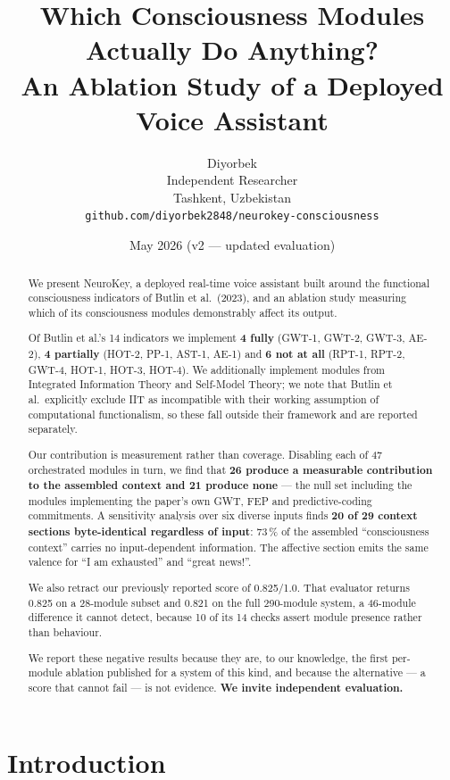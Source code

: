 \documentclass[11pt,a4paper]{article}
\title{\textbf{Which Consciousness Modules Actually Do Anything?\\
An Ablation Study of a Deployed Voice Assistant}}
\author{
  Diyorbek\\
  Independent Researcher\\
  Tashkent, Uzbekistan\\
  \texttt{github.com/diyorbek2848/neurokey-consciousness}
}
\date{May 2026 (v2 — updated evaluation)}
\begin{document}
\maketitle

\begin{abstract}
We present NeuroKey, a deployed real-time voice assistant built around the functional
consciousness indicators of Butlin et al.\ (2023), and an ablation study measuring which
of its consciousness modules demonstrably affect its output.

Of Butlin et al.'s 14 indicators we implement \textbf{4 fully} (GWT-1, GWT-2, GWT-3, AE-2),
\textbf{4 partially} (HOT-2, PP-1, AST-1, AE-1) and \textbf{6 not at all} (RPT-1, RPT-2,
GWT-4, HOT-1, HOT-3, HOT-4). We additionally implement modules from Integrated Information
Theory and Self-Model Theory; we note that Butlin et al.\ explicitly exclude IIT as
incompatible with their working assumption of computational functionalism, so these fall
outside their framework and are reported separately.

Our contribution is measurement rather than coverage. Disabling each of 47 orchestrated
modules in turn, we find that \textbf{26 produce a measurable contribution to the assembled
context and 21 produce none} --- the null set including the modules implementing the paper's
own GWT, FEP and predictive-coding commitments. A sensitivity analysis over six diverse
inputs finds \textbf{20 of 29 context sections byte-identical regardless of input}: 73\,\% of
the assembled ``consciousness context'' carries no input-dependent information. The affective
section emits the same valence for ``I am exhausted'' and ``great news!''.

We also retract our previously reported score of 0.825/1.0. That evaluator returns 0.825 on a
28-module subset and 0.821 on the full 290-module system, a 46-module difference it cannot
detect, because 10 of its 14 checks assert module presence rather than behaviour.

We report these negative results because they are, to our knowledge, the first per-module
ablation published for a system of this kind, and because the alternative --- a score that
cannot fail --- is not evidence. \textbf{We invite independent evaluation.}
\end{abstract}

\section{Introduction}
\end{document}
